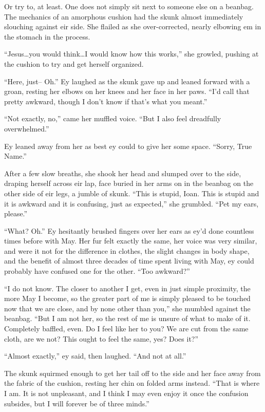 Or try to, at least. One does not simply sit next to someone else on a beanbag. The mechanics of an amorphous cushion had the skunk almost immediately slouching against eir side. She flailed as she over-corrected, nearly elbowing em in the stomach in the process.

``Jesus\ldots you would think\ldots I would know how this works,'' she growled, pushing at the cushion to try and get herself organized.

``Here, just-- Oh.'' Ey laughed as the skunk gave up and leaned forward with a groan, resting her elbows on her knees and her face in her paws. ``I'd call that pretty awkward, though I don't know if that's what you meant.''

``Not exactly, no,'' came her muffled voice. ``But I also feel dreadfully overwhelmed.''

Ey leaned away from her as best ey could to give her some space. ``Sorry, True Name.''

After a few slow breaths, she shook her head and slumped over to the side, draping herself across eir lap, face buried in her arms on in the beanbag on the other side of eir legs, a jumble of skunk. ``This is stupid, Ioan. This is stupid and it is awkward and it is confusing, just as expected,'' she grumbled. ``Pet my ears, please.''

``What? Oh.'' Ey hesitantly brushed fingers over her ears as ey'd done countless times before with May. Her fur felt exactly the same, her voice was very similar, and were it not for the difference in clothes, the slight changes in body shape, and the benefit of almost three decades of time spent living with May, ey could probably have confused one for the other. ``Too awkward?''

``I do not know. The closer to another I get, even in just simple proximity, the more May I become, so the greater part of me is simply pleased to be touched now that we are close, and by none other than you,'' she mumbled against the beanbag. ``But I am not her, so the rest of me is unsure of what to make of it. Completely baffled, even. Do I feel like her to you? We are cut from the same cloth, are we not? This ought to feel the same, yes? Does it?''

``Almost exactly,'' ey said, then laughed. ``And not at all.''

The skunk squirmed enough to get her tail off to the side and her face away from the fabric of the cushion, resting her chin on folded arms instead. ``That is where I am. It is not unpleasant, and I think I may even enjoy it once the confusion subsides, but I will forever be of three minds.''

